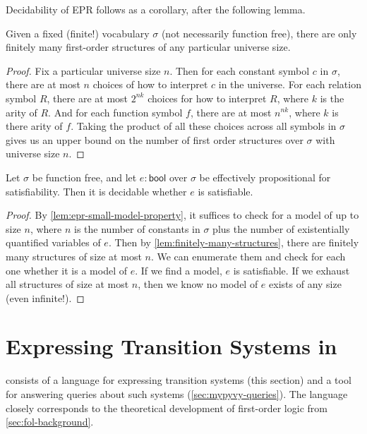 Decidability of EPR follows as a corollary, after the following lemma.
\begin{lemma}\label{lem:finitely-many-structures}
  Given a fixed (finite!) vocabulary $\sigma$ (not necessarily function free),
  there are only finitely many first-order structures of any particular universe size.
\end{lemma}
\begin{proof}
  Fix a particular universe size $n$. Then for each constant symbol $c$ in
  $\sigma$, there are at most $n$ choices of how to interpret $c$ in the universe.
  For each relation symbol $R$, there are at most $2^{nk}$ choices for how to interpret $R$, where $k$ is the arity of $R$.
  And for each function symbol $f$, there are at most $n^{nk}$, where $k$ is there arity of $f$.
  Taking the product of all these choices across all symbols in $\sigma$ gives us an upper bound on the number of first order structures
  over $\sigma$ with universe size $n$.
\end{proof}

\begin{theorem}
  Let $\sigma$ be function free,
  and let $e : \mathsf{bool}$ over $\sigma$ be effectively propositional for satisfiability.
  Then it is decidable whether $e$ is satisfiable.
\end{theorem}
\begin{proof}
  By \cref{lem:epr-small-model-property}, it suffices to check for a model of up to size $n$,
  where $n$ is the number of constants in $\sigma$
  plus the number of existentially quantified variables of $e$.
  Then by \cref{lem:finitely-many-structures},
  there are finitely many structures of size at most $n$.
  We can enumerate them and check for each one
  whether it is a model of $e$.
  If we find a model, $e$ is satisfiable.
  If we exhaust all structures of size at most $n$,
  then we know no model of $e$ exists of any size (even infinite!).
\end{proof}



\section{Expressing Transition Systems in \mypyvy}\label{sec:mypyvy-expressing-ts}

\mypyvy consists of a language for expressing transition systems (this section)
  and a tool for answering queries about such systems (\cref{sec:mypyvy-queries}).
The \mypyvy language closely corresponds to
  the theoretical development of first-order logic from \cref{sec:fol-background}.

